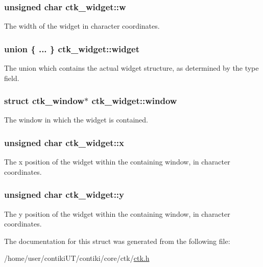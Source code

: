 \subsubsection[{w}]{\setlength{\rightskip}{0pt plus 5cm}unsigned char ctk\+\_\+widget\+::w}\label{structctk__widget_ad28eb196d37bba6a60b48f4c7e6eb45e}
The width of the widget in character coordinates. \hypertarget{structctk__widget_afead36ab9579674197fdf985ccb82555}{}
\subsubsection[{widget}]{\setlength{\rightskip}{0pt plus 5cm}union \{ ... \}   ctk\+\_\+widget\+::widget}\label{structctk__widget_afead36ab9579674197fdf985ccb82555}
The union which contains the actual widget structure, as determined by the type field. \hypertarget{structctk__widget_a07d184cf7dba0e5051b132da7f392490}{}
\subsubsection[{window}]{\setlength{\rightskip}{0pt plus 5cm}struct {\bf ctk\+\_\+window}$\ast$ ctk\+\_\+widget\+::window}\label{structctk__widget_a07d184cf7dba0e5051b132da7f392490}
The window in which the widget is contained. \hypertarget{structctk__widget_a58125a019e53600eae696dac334c6b82}{}
\subsubsection[{x}]{\setlength{\rightskip}{0pt plus 5cm}unsigned char ctk\+\_\+widget\+::x}\label{structctk__widget_a58125a019e53600eae696dac334c6b82}
The x position of the widget within the containing window, in character coordinates. \hypertarget{structctk__widget_a64d6f0d7568e491e7f5cd0d38f40d1af}{}
\subsubsection[{y}]{\setlength{\rightskip}{0pt plus 5cm}unsigned char ctk\+\_\+widget\+::y}\label{structctk__widget_a64d6f0d7568e491e7f5cd0d38f40d1af}
The y position of the widget within the containing window, in character coordinates. 

The documentation for this struct was generated from the following file\+:\begin{DoxyCompactItemize}
\item 
/home/user/contiki\+U\+T/contiki/core/ctk/\hyperlink{ctk_8h}{ctk.\+h}\end{DoxyCompactItemize}

